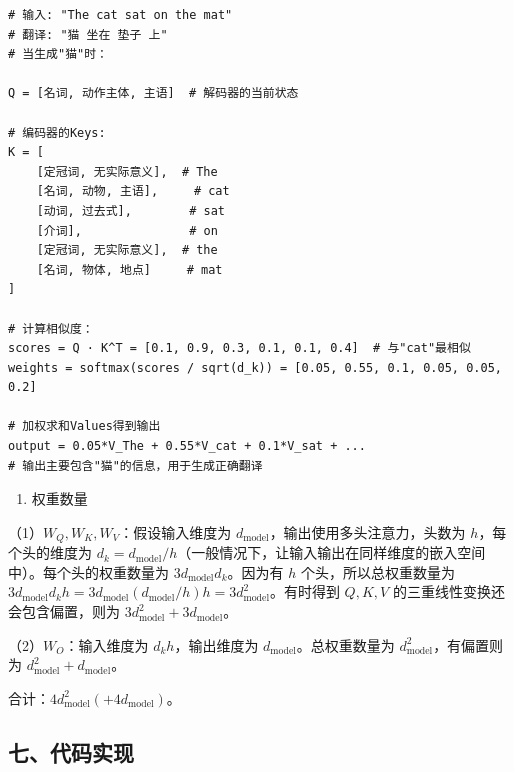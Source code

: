 \begin{verbatim}
# 输入: "The cat sat on the mat"
# 翻译: "猫 坐在 垫子 上"
# 当生成"猫"时：

Q = [名词, 动作主体, 主语]  # 解码器的当前状态

# 编码器的Keys:
K = [
    [定冠词, 无实际意义],  # The
    [名词, 动物, 主语],     # cat
    [动词, 过去式],        # sat
    [介词],               # on
    [定冠词, 无实际意义],  # the
    [名词, 物体, 地点]     # mat
]

# 计算相似度：
scores = Q · K^T = [0.1, 0.9, 0.3, 0.1, 0.1, 0.4]  # 与"cat"最相似
weights = softmax(scores / sqrt(d_k)) = [0.05, 0.55, 0.1, 0.05, 0.05, 0.2]

# 加权求和Values得到输出
output = 0.05*V_The + 0.55*V_cat + 0.1*V_sat + ...
# 输出主要包含"猫"的信息，用于生成正确翻译
\end{verbatim}

\begin{enumerate}
\def\labelenumi{\arabic{enumi}.}
\setcounter{enumi}{5}
\tightlist
\item
  权重数量
\end{enumerate}

（1）\(W_Q,W_K,W_V\)：假设输入维度为 \(d_{\mathrm{model}}\)，输出使用多头注意力，头数为 \(h\)，每个头的维度为 \(d_k=d_{\mathrm{model}}/h\)（一般情况下，让输入输出在同样维度的嵌入空间中）。每个头的权重数量为 \(3d_{\mathrm{model}}d_k\)。因为有 \(h\) 个头，所以总权重数量为 \(3d_{\mathrm{model}}d_kh=3d_{\mathrm{model}}(d_{\mathrm{model}}/h)h=3d_{\mathrm{model}}^2\)。有时得到 \(Q,K,V\) 的三重线性变换还会包含偏置，则为 \(3d_{\mathrm{model}}^2+3d_{\mathrm{model}}\)。

（2）\(W_O\)：输入维度为 \(d_kh\)，输出维度为 \(d_{\mathrm{model}}\)。总权重数量为 \(d_{\mathrm{model}}^2\)，有偏置则为 \(d_{\mathrm{model}}^2+d_{\mathrm{model}}\)。

合计：\(4d_{\mathrm{model}}^2(+4d_{\mathrm{model}})\)。

\hypertarget{ux4e03ux4ee3ux7801ux5b9eux73b0}{%
\subsection{七、代码实现}\label{ux4e03ux4ee3ux7801ux5b9eux73b0}}

